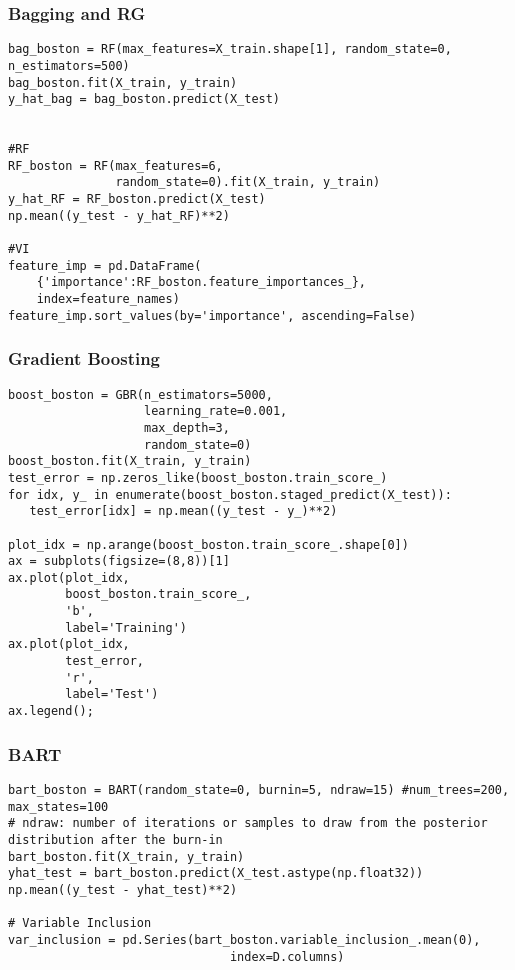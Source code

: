 \documentclass[
  letterpaper,
  DIV=11,
  numbers=noendperiod]{scrreprt}
\begin{document}
\subsubsection{Bagging and RG}\label{bagging-and-rg}

\begin{verbatim}
bag_boston = RF(max_features=X_train.shape[1], random_state=0, n_estimators=500)
bag_boston.fit(X_train, y_train)
y_hat_bag = bag_boston.predict(X_test)


#RF
RF_boston = RF(max_features=6,
               random_state=0).fit(X_train, y_train)
y_hat_RF = RF_boston.predict(X_test)
np.mean((y_test - y_hat_RF)**2)

#VI
feature_imp = pd.DataFrame(
    {'importance':RF_boston.feature_importances_},
    index=feature_names)
feature_imp.sort_values(by='importance', ascending=False)
\end{verbatim}

\subsubsection{Gradient Boosting}\label{gradient-boosting}

\begin{verbatim}
boost_boston = GBR(n_estimators=5000,
                   learning_rate=0.001,
                   max_depth=3,
                   random_state=0)
boost_boston.fit(X_train, y_train)
test_error = np.zeros_like(boost_boston.train_score_)
for idx, y_ in enumerate(boost_boston.staged_predict(X_test)):
   test_error[idx] = np.mean((y_test - y_)**2)

plot_idx = np.arange(boost_boston.train_score_.shape[0])
ax = subplots(figsize=(8,8))[1]
ax.plot(plot_idx,
        boost_boston.train_score_,
        'b',
        label='Training')
ax.plot(plot_idx,
        test_error,
        'r',
        label='Test')
ax.legend();
\end{verbatim}

\subsubsection{BART}\label{bart}

\begin{verbatim}
bart_boston = BART(random_state=0, burnin=5, ndraw=15) #num_trees=200, max_states=100
# ndraw: number of iterations or samples to draw from the posterior distribution after the burn-in 
bart_boston.fit(X_train, y_train)
yhat_test = bart_boston.predict(X_test.astype(np.float32))
np.mean((y_test - yhat_test)**2)

# Variable Inclusion
var_inclusion = pd.Series(bart_boston.variable_inclusion_.mean(0),
                               index=D.columns)
\end{verbatim}
\end{document}
